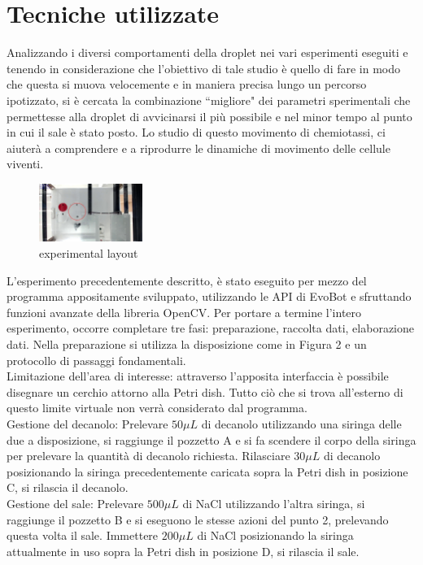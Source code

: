 \section{Tecniche utilizzate}
Analizzando i diversi comportamenti della droplet nei vari esperimenti eseguiti e tenendo in considerazione che l'obiettivo di tale studio è quello di fare in modo che questa si muova velocemente e in maniera precisa lungo un percorso ipotizzato, si è cercata la combinazione ``migliore" dei parametri sperimentali che permettesse alla droplet di avvicinarsi il più possibile e nel minor tempo al punto in cui il sale è stato posto. Lo studio di questo movimento di chemiotassi, ci aiuterà a comprendere e a riprodurre le dinamiche di movimento delle cellule viventi. 
\begin{figure}
\begin{center}
	  \includegraphics[width=0.3\textwidth]{immagini/exp1.jpg}
\end{center}
	 \caption{experimental layout}
\end{figure} 
L'esperimento precedentemente descritto, è stato eseguito per mezzo del programma appositamente sviluppato, utilizzando le API di EvoBot e sfruttando funzioni avanzate della libreria OpenCV. 
Per portare a termine l'intero esperimento, occorre completare tre fasi: preparazione, raccolta dati, elaborazione dati. 
Nella preparazione si utilizza la disposizione come in Figura 2 e un protocollo di passaggi fondamentali.
\\Limitazione dell'area di interesse: attraverso l'apposita interfaccia è possibile disegnare un cerchio attorno alla Petri dish. Tutto ciò che si trova all'esterno di questo limite virtuale non verrà considerato dal programma.
\\Gestione del decanolo: Prelevare $50\mu L$ di decanolo utilizzando una siringa delle due a disposizione, si raggiunge il pozzetto A e si fa scendere il corpo della siringa per prelevare la quantità di decanolo richiesta. Rilasciare $30\mu L$ di decanolo posizionando la siringa precedentemente caricata sopra la Petri dish in posizione C, si rilascia il decanolo. 
\\Gestione del sale: Prelevare $500\mu L$ di NaCl utilizzando l'altra siringa, si raggiunge il pozzetto B e si eseguono le stesse azioni del punto 2, prelevando questa volta il sale. Immettere $200\mu L$ di NaCl posizionando la siringa attualmente in uso sopra la Petri dish in posizione D, si rilascia il sale. 
